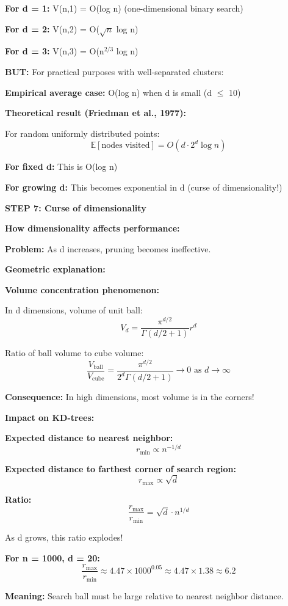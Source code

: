 \documentclass[12pt]{article}
\begin{document}
\begin{solution}
\textbf{For d = 1:} V(n,1) = O(log n) (one-dimensional binary search)

\textbf{For d = 2:} V(n,2) = O($\sqrt{n}$ log n)

\textbf{For d = 3:} V(n,3) = O(n$^{2/3}$ log n)

\textbf{BUT:} For practical purposes with well-separated clusters:

\textbf{Empirical average case:} O(log n) when d is small (d $\leq$ 10)

\textbf{Theoretical result (Friedman et al., 1977):}

For random uniformly distributed points:
\[
\mathbb{E}[\text{nodes visited}] = O(d \cdot 2^d \log n)
\]

\textbf{For fixed d:} This is O(log n) \quad \checkmark

\textbf{For growing d:} This becomes exponential in d (curse of dimensionality!)

\textbf{STEP 7: Curse of dimensionality}

\textbf{How dimensionality affects performance:}

\textbf{Problem:} As d increases, pruning becomes ineffective.

\textbf{Geometric explanation:}

\textbf{Volume concentration phenomenon:}

In d dimensions, volume of unit ball:
\[
V_d = \frac{\pi^{d/2}}{\Gamma(d/2 + 1)} r^d
\]

Ratio of ball volume to cube volume:
\[
\frac{V_{\text{ball}}}{V_{\text{cube}}} = \frac{\pi^{d/2}}{2^d \Gamma(d/2 + 1)} \to 0 \text{ as } d \to \infty
\]

\textbf{Consequence:} In high dimensions, most volume is in the corners!

\textbf{Impact on KD-trees:}

\textbf{Expected distance to nearest neighbor:}
\[
r_{\text{min}} \propto n^{-1/d}
\]

\textbf{Expected distance to farthest corner of search region:}
\[
r_{\text{max}} \propto \sqrt{d}
\]

\textbf{Ratio:}
\[
\frac{r_{\text{max}}}{r_{\text{min}}} = \sqrt{d} \cdot n^{1/d}
\]

As d grows, this ratio explodes!

\textbf{For n = 1000, d = 20:}
\[
\frac{r_{\text{max}}}{r_{\text{min}}} \approx 4.47 \times 1000^{0.05} \approx 4.47 \times 1.38 \approx 6.2
\]

\textbf{Meaning:} Search ball must be large relative to nearest neighbor distance.


\end{solution}
\end{document}
